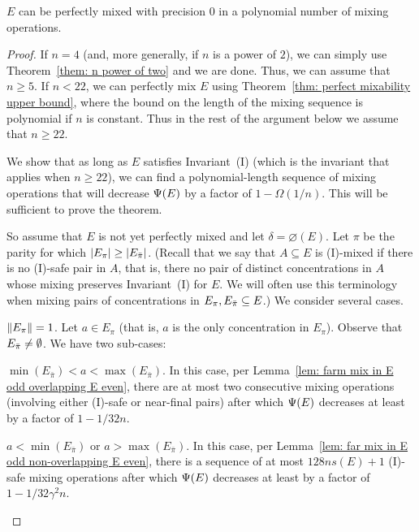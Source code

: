 
\begin{theorem} \label{thm: perfect mixability polynomial}
	$E$ can be perfectly mixed with precision $0$ 
	in a polynomial number of mixing operations.
\end{theorem} 

\begin{proof}
	If $n = 4$ (and, more generally, if $n$ is a power of $2$), we can simply use 
	Theorem~\ref{them: n power of two} and we are done.
	Thus, we can assume that $n\geq 5$.	
	If $n<22$, we can perfectly mix $E$ using Theorem~\ref{thm: perfect mixability upper bound},
	where the bound on the length of the mixing sequence is polynomial if $n$ is constant.
	Thus in the rest of the argument below we assume that $n \geq 22$.
	
	We show that as long as $E$ satisfies Invariant~(I) (which is the invariant that applies when $n\ge 22$),
	we can find a polynomial-length sequence of mixing operations that will
	decrease ${\Psi}(E)$ by a factor of $1-\Omega(1/n)$. This will be sufficient to prove the theorem.
	
	So assume that $E$ is not yet perfectly mixed and let $\delta=\diameter(E)$. Let $\pi$ be the parity
	for which ${|E_{\pi}|}\geq{|E_{{\bar{\pi}}}|}$.
	(Recall that we say that $A\subseteq E$ is (I)-mixed if there is no (I)-safe pair in $A$,
	that is, there no pair of distinct concentrations in $A$ whose mixing preserves Invariant~(I) for $E$.
	We will often use this terminology when mixing pairs of concentrations in $E_\pi,E_{\bar{\pi}}\subseteq E$.)
	We consider several cases.
	
	
	\medskip\noindent
	 ${\|E_{\pi}\|}=1$.
	Let $a\in E_{\pi}$ (that is, $a$ is the only concentration in $E_{\pi}$). 
	Observe that $E_{{\bar{\pi}}}\neq\emptyset$. We have two sub-cases:
	
	\begin{description}

		\item{} $\min(E_{\bar{\pi}}) < a < \max(E_{\bar{\pi}})$.
		In this case, per Lemma~\ref{lem: farm mix in E odd overlapping E even},
		there are at most two consecutive mixing operations 
		(involving either (I)-safe or near-final pairs)
		after which ${\Psi}(E)$ decreases at least by a factor of $1 - 1/32n$.

		\item {} $a < \min(E_{\bar{\pi}})$ or $a > \max(E_{\bar{\pi}})$. In this case,
		per Lemma~\ref{lem: far mix in E odd non-overlapping E even}, there is a sequence of
		at most $128ns(E)+1$ (I)-safe mixing operations after which
		${\Psi}(E)$ decreases at least by a factor of $1 - 1/32\gamma^2n$.
		

\end{description}
\end{proof}
